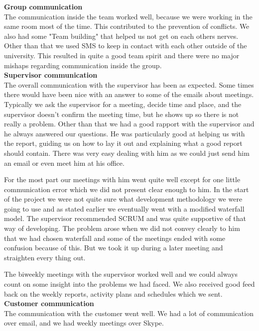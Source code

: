 
\indent \indent \textbf{Group communication} \\
The communication inside the team worked well, because we were working in the same room most of the time. This contributed to the prevention of conflicts. We also had some "Team building" that helped us not get on each others nerves. Other than that we used SMS to keep in contact with each other outside of the university. This resulted in quite a good team spirit and there were no major mishaps regarding communication inside the group.
\\

\textbf{Supervisor communication} \\
The overall communication with the supervisor has been as expected. Some times there would have been nice with an answer to some of the emails about meetings. Typically we ask the supervisor for a meeting, decide time and place, and the supervisor doesn't confirm the meeting time, but he shows up so there is not really a problem. Other than that we had a good rapport with the supervisor and he always answered our questions. He was particularly good at helping us with the report, guiding us on how to lay it out and explaining what a good report should contain. There was very easy dealing with him as we could just send him an email or even meet him at his office.

For the most part our meetings with him went quite well except for one little communication error which we did not present clear enough to him. In the start of the project we were not quite sure what development methodology we were going to use and as stated earlier we eventually went with a modified waterfall model. The supervisor recommended SCRUM and was quite supportive of that way of developing. The problem arose when we did not convey clearly to him that we had chosen waterfall and some of the meetings ended with some confusion because of this. But we took it up during a later meeting and straighten every thing out.

The biweekly meetings with the supervisor worked well and we could always count on some insight into the problems we had faced. We also received good feed back on the weekly reports, activity plans and schedules which we sent.
\\ 

\textbf{Customer communication} \\
The communication with the customer went well. We had a lot of communication over email, and we had weekly meetings over Skype. 
\\

